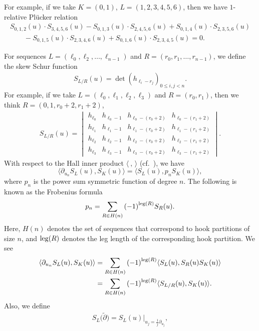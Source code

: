 \documentclass[pdftex]{sigma}
\numberwithin{equation}{section}
\begin{document}
For example, if we take $K=(0,1)$, $L=(1,2,3,4,5,6)$, then we have $1$-relative Pl\"ucker relation
\begin{gather*}
S_{0,1,2}(u)\cdot S_{3,4,5,6}(u)-S_{0,1,3}(u)\cdot S_{2,4,5,6}(u)+S_{0,1,4}(u)\cdot S_{2,3,5,6}(u)\\
\qquad{}-S_{0,1,5}(u)\cdot S_{2,3,4,6}(u)+S_{0,1,6}(u)\cdot S_{2,3,4,5}(u)=0.
\end{gather*}

For sequences $L=(\ell_0,\ell_2,\dots,\ell_{n-1})$ and $R=(r_0,r_1,\dots,r_{n-1})$, we define the skew Schur function
\begin{gather*}
S_{L/R}(u)=\det{(h_{\ell_i-r_{j}})}_{0\leq i,j< n}.%
\end{gather*}
For example, if we take $L=(\ell_0,\ell_1,\ell_{2},\ell_{3})$ and $R=(r_0,r_1)$, then we think $R=(0,1,r_{0}+2,r_{1}+2)$,
\begin{gather*}
S_{L/R}(u)=
\begin{vmatrix}
h_{\ell_0} & h_{\ell_0-1} & h_{\ell_0-(r_0+2)} & h_{\ell_0-(r_1+2)} \\
h_{\ell_1} & h_{\ell_1-1} & h_{\ell_1-(r_0+2)} & h_{\ell_1-(r_1+2)} \\
h_{\ell_2} & h_{\ell_2-1} & h_{\ell_2-(r_0+2)} &h_{\ell_2-(r_1+2)}\\
h_{\ell_3} & h_{\ell_3-1} & h_{\ell_3-(r_0+2)} & h_{\ell_3-(r_1+2)}
\end{vmatrix}.
\end{gather*}
With respect to the Hall inner product $\langle\ ,\, \rangle$ (cf.\ \cite{mac}), we have
\[
\langle \partial_{u_n} S_{L}(u), S_{K}(u)\rangle =\langle S_{L}(u), p_nS_{K}(u)\rangle,\nonumber
\]
where $p_n$ is the power sum symmetric function of degree $n$.
The following is known as the Frobenius formula \cite{mac}
\begin{gather*}
p_{n}=\sum_{R\in H(n)}{(-1)}^{{\rm leg}(R)}S_{R}(u).\nonumber
\end{gather*}
Here, $H(n)$ denotes the set of sequences that correspond to hook partitions of size $n$, and ${\rm leg}(R)$ denotes the leg length of the corresponding hook partition. We see
\begin{align*}
\langle \partial_{u_n} S_{L}(u), S_{K}(u)\rangle &=\sum_{R\in H(n)}{(-1)}^{{\rm leg}(R)}\langle S_{L}(u),S_{R}(u)S_{K}(u)\rangle\nonumber\\
&=\sum_{R\in H(n)}{(-1)}^{{\rm leg}(R)}\langle S_{L/R}(u),S_{K}(u)\rangle.\nonumber
\end{align*}
Also, we define
\begin{gather*}
S_L\bigl(\tilde{\partial}\bigr)=S_{L}(u)|_{u_j=\frac{1}{j}\partial_{u_j}},
\end{gather*}
\end{document}
